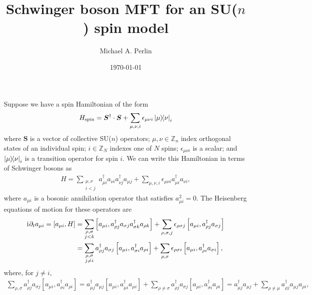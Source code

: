 \documentclass[nofootinbib,notitlepage,11pt]{revtex4-2}
\renewcommand{\t}{\text} %
\renewcommand{\sp}[1]{\left[#1\right]} %
\renewcommand{\v}{\bm} %
\renewcommand{\c}{\cdot} %
\renewcommand{\d}{\partial} %
\renewcommand{\i}{\mathrm{i}\mkern1mu} %
\newcommand{\1}{\mathds{1}}
\newcommand{\ZZ}{\mathbb{Z}}
\begin{document}
\thispagestyle{fancy}

\title{Schwinger boson MFT for an SU($n$) spin model}%
\author{Michael A. Perlin}%
\date{\today}

\maketitle

Suppose we have a spin Hamiltonian of the form
\begin{align}
  H_{\t{spin}} = \v S^\dag\c\v S
  + \sum_{\mu,\nu,i} \epsilon_{\mu\nu i} \op{\mu}{\nu}_i
\end{align}
where $\v S$ is a vector of collective SU($n$) operators;
$\mu,\nu\in\ZZ_n$ index orthogonal states of an individual spin;
$i\in\ZZ_N$ indexes one of $N$ spins; $\epsilon_{\mu\nu i}$ is a
scalar; and $\op{\mu}{\nu}_i$ is a transition operator for spin $i$.
We can write this Hamiltonian in terms of Schwinger bosons as
\begin{align}
  H = \sum_{\substack{\mu,\nu\\i<j}}
  a_{\mu i}^\dag a_{\nu i} a_{\nu j}^\dag a_{\mu j}
  + \sum_{\mu,\nu,i} \epsilon_{\mu\nu i} a_{\mu i}^\dag a_{\nu i},
\end{align}
where $a_{\mu i}$ is a bosonic annihilation operator that satisfies
$a_{\mu i}^2=0$.  The Heisenberg equations of motion for these
operators are
\begin{align}
  \i \d_t a_{\mu i}
  = \sp{a_{\mu i},H}
  &= \sum_{\substack{\rho,\sigma\\j<k}}
  \sp{a_{\mu i}, a_{\rho j}^\dag a_{\sigma j}
    a_{\sigma k}^\dag a_{\rho k}}
  + \sum_{\rho,\sigma,j} \epsilon_{\rho\sigma j}
  \sp{a_{\mu i}, a_{\rho j}^\dag a_{\sigma j}} \\
  &= \sum_{\substack{\rho,\sigma\\j\ne i}} a_{\rho j}^\dag a_{\sigma j}
  \sp{a_{\mu i}, a_{\sigma i}^\dag a_{\rho i}}
  + \sum_{\rho,\sigma} \epsilon_{\rho\sigma i}
  \sp{a_{\mu i}, a_{\rho i}^\dag a_{\sigma i}},
\end{align}
where, for $j\ne i$,
\begin{align}
  \sum_{\rho,\sigma} a_{\rho j}^\dag a_{\sigma j}
  \sp{a_{\mu i}, a_{\sigma i}^\dag a_{\rho i}}
  = a_{\mu j}^\dag a_{\mu j}
  \sp{a_{\mu i}, a_{\mu i}^\dag a_{\mu i}}
  + \sum_{\rho\ne\sigma} a_{\rho j}^\dag a_{\sigma j}
  \sp{a_{\mu i}, a_{\sigma i}^\dag a_{\rho i}}
  = a_{\mu j}^\dag a_{\mu j}
  + \sum_{\rho\ne\mu} a_{\rho j}^\dag a_{\mu j} a_{\rho i},
\end{align}
\end{document}
